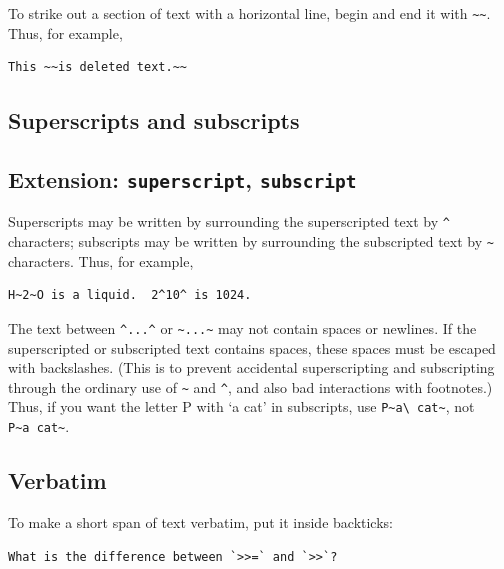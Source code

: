 \documentclass[
  b5paper
]{book}
\begin{document}
To strike out a section of text with a horizontal line, begin and end it
with \texttt{\textasciitilde{}\textasciitilde{}}. Thus, for example,

\begin{verbatim}
This ~~is deleted text.~~
\end{verbatim}

\subsection{Superscripts and
subscripts}\label{superscripts-and-subscripts}

\subsection{\texorpdfstring{Extension: \texttt{superscript},
\texttt{subscript}}{Extension: superscript, subscript}}\label{extension-superscript-subscript}

Superscripts may be written by surrounding the superscripted text by
\texttt{\^{}} characters; subscripts may be written by surrounding the
subscripted text by \texttt{\textasciitilde{}} characters. Thus, for
example,

\begin{verbatim}
H~2~O is a liquid.  2^10^ is 1024.
\end{verbatim}

The text between \texttt{\^{}...\^{}} or
\texttt{\textasciitilde{}...\textasciitilde{}} may not contain spaces or
newlines. If the superscripted or subscripted text contains spaces,
these spaces must be escaped with backslashes. (This is to prevent
accidental superscripting and subscripting through the ordinary use of
\texttt{\textasciitilde{}} and \texttt{\^{}}, and also bad interactions
with footnotes.) Thus, if you want the letter P with `a cat' in
subscripts, use
\texttt{P\textasciitilde{}a\textbackslash{}\ cat\textasciitilde{}}, not
\texttt{P\textasciitilde{}a\ cat\textasciitilde{}}.

\subsection{Verbatim}\label{verbatim}

To make a short span of text verbatim, put it inside backticks:

\begin{verbatim}
What is the difference between `>>=` and `>>`?
\end{verbatim}
\end{document}
